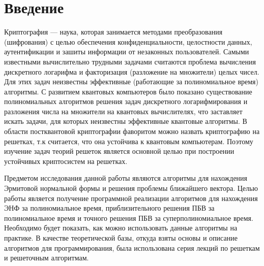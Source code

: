 \newpage

\section{Введение}

Криптография --- наука, которая занимается методами преобразования (шифрования) с целью обеспечения конфиденциальности, целостности данных, аутентификации и зашиты информации от незаконных пользователей. Самыми известными вычислительно трудными задачами считаются проблема вычисления дискретного логарифма и факторизация (разложение на множители) целых чисел. Для этих задач неизвестны эффективные (работающие за полиномиальное время) алгоритмы. С развитием квантовых компьютеров было показано существование полиномиальных алгоритмов решения задач дискретного логарифмирования и разложения числа на множители на квантовых вычислителях\cite{Shor}, что заставляет искать задачи, для которых неизвестны эффективные квантовые алгоритмы. В области постквантовой криптографии фаворитом можно назвать криптографию на решетках, т.к считается, что она устойчива к квантовым компьютерам. Поэтому изучение задач теорий решеток является основной целью при построении устойчивых криптосистем на решетках.

Предметом исследования данной работы являются алгоритмы для нахождения Эрмитовой нормальной формы и решения проблемы ближайшего вектора. Целью работы является получение программной реализации алгоритмов для нахождения ЭНФ за полиномиальное время, приблизительного решения ПБВ за полиномиальное время и точного решения ПБВ за суперполиномиальное время. Необходимо будет показать, как можно использовать данные алгоритмы на практике. В качестве теоретической базы, откуда взяты основы и описание алгоритмов для программирования, была использована серия лекций по решеткам и решеточным алгоритмам.


\clearpage

